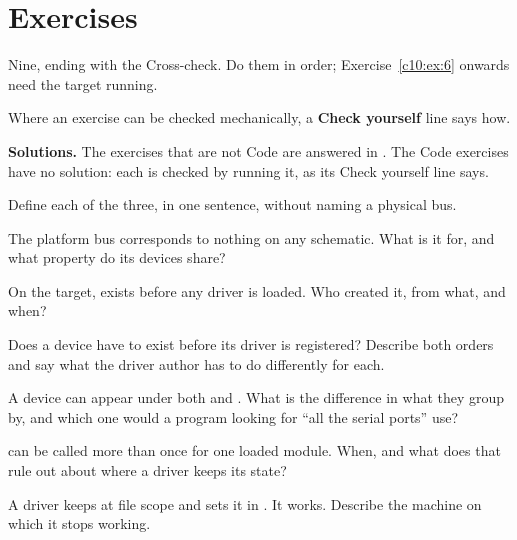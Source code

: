 
\section{Exercises}
\label{c10:sec:exercises}\label{c10:app:c}

\begin{aside}
Nine, ending with the Cross-check. Do them in order; Exercise~\ref{c10:ex:6} onwards need the target
running.

Where an exercise can be checked mechanically, a \textbf{Check yourself} line says how.

\textbf{Solutions.} The exercises that are not Code are answered in . The Code
exercises have no solution: each is checked by running it, as its Check yourself line says.
\end{aside}

\label{c10:ex:1}

 Define each of the three, in one sentence, without naming a physical bus.

 The platform bus corresponds to nothing on any schematic. What is it for, and what
property do its devices share?

 On the target,  exists before any driver is
loaded. Who created it, from what, and when?

 Does a device have to exist before its driver is registered? Describe both orders and say
what the driver author has to do differently for each.

 A device can appear under both  and . What is the
difference in what they group by, and which one would a program looking for ``all the serial
ports'' use?

\label{c10:ex:2}

  can be called more than once for one loaded module. When, and what does that
rule out about where a driver keeps its state?

 A driver keeps  at file scope and sets it in
. It works. Describe the machine on which it stops working.

